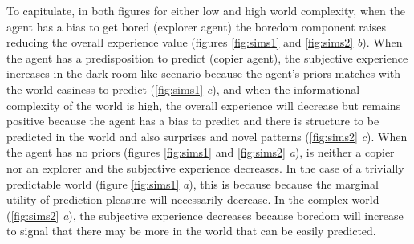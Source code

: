 \documentclass[11pt, onecolumn]{article}
\begin{document}
To capitulate, in both figures for either low and high world complexity, when the agent has a bias to get bored (explorer agent) the boredom component raises reducing the overall experience value (figures \ref{fig:sims1} and \ref{fig:sims2} \emph{b}). When the agent has a predisposition to predict (copier agent), the subjective experience increases in the dark room like scenario because the agent's priors matches with the world easiness to predict (\ref{fig:sims1} \emph{c}), and when the informational complexity of the world is high, the overall experience will decrease but remains positive because the agent has a bias to predict and there is structure to be predicted in the world and also surprises and novel patterns (\ref{fig:sims2} \emph{c}). When the agent has no priors (figures \ref{fig:sims1} and \ref{fig:sims2} \emph{a}), is neither a copier nor an explorer and the subjective experience decreases. In the case of a trivially predictable world (figure \ref{fig:sims1} \emph{a}), this is because because the marginal utility of prediction pleasure will necessarily decrease. In the complex world (\ref{fig:sims2} \emph{a}), the subjective experience decreases because boredom will increase to signal that there may be more in the world that can be easily predicted.
\end{document}
